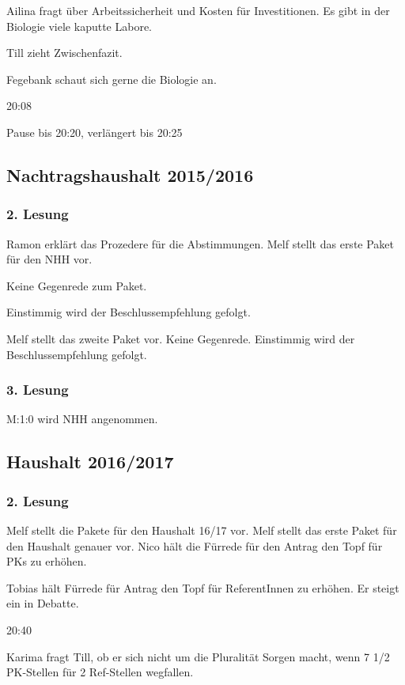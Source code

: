 \documentclass[ngerman,headheight=70pt]{scrartcl}
\begin{document}
    Ailina fragt über Arbeitssicherheit und Kosten für Investitionen.
    Es gibt in der Biologie viele kaputte Labore.

    Till zieht Zwischenfazit.

    Fegebank schaut sich gerne die Biologie an.

    20:08

    Pause bis 20:20, verlängert bis 20:25

    \subsection{Nachtragshaushalt 2015/2016}
    \subsubsection{2. Lesung}

    Ramon erklärt das Prozedere für die Abstimmungen. Melf stellt das erste
    Paket für den NHH vor.

    Keine Gegenrede zum Paket.

    Einstimmig wird der Beschlussempfehlung gefolgt.

    Melf stellt das zweite Paket vor. Keine Gegenrede. Einstimmig wird der
    Beschlussempfehlung gefolgt.

    \subsubsection{3. Lesung}

    M:1:0 wird NHH angenommen.

    \subsection{Haushalt 2016/2017}

    \subsubsection{2. Lesung}

    Melf stellt die Pakete für den Haushalt 16/17 vor. Melf stellt das erste
    Paket für den Haushalt genauer vor. Nico hält die Fürrede für den Antrag
    den Topf für PKs zu erhöhen.

    Tobias hält Fürrede für Antrag den Topf für ReferentInnen zu erhöhen. Er
    steigt ein in Debatte.

    20:40

    Karima fragt Till, ob er sich nicht um die Pluralität Sorgen macht, wenn
    7 1/2 PK-Stellen für 2 Ref-Stellen wegfallen.
\end{document}
